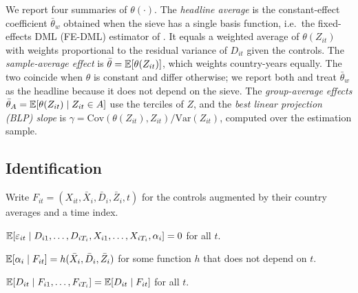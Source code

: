\documentclass[preprint,12pt,authoryear]{elsarticle}
\begin{document}
We report four summaries of $\theta(\cdot)$. The \emph{headline average} is the constant-effect coefficient $\bar\theta_w$ obtained when the sieve has a single basis function, i.e.\ the fixed-effects DML (FE-DML) estimator of \citet{clarke2023panel}. It equals a weighted average of $\theta(Z_{it})$ with weights proportional to the residual variance of $D_{it}$ given the controls. The \emph{sample-average effect} is $\bar\theta=\mathbb{E}[\theta(Z_{it})]$, which weights country-years equally. The two coincide when $\theta$ is constant and differ otherwise; we report both and treat $\bar\theta_w$ as the headline because it does not depend on the sieve. The \emph{group-average effects} $\bar\theta_A=\mathbb{E}[\theta(Z_{it})\mid Z_{it}\in A]$ use the terciles of $Z$, and the \emph{best linear projection (BLP) slope} is $\gamma=\mathrm{Cov}(\theta(Z_{it}),Z_{it})/\mathrm{Var}(Z_{it})$, computed over the estimation sample.

\subsection{Identification}

Write $F_{it}=(X_{it},\bar X_i,\bar D_i,\bar Z_i,t)$ for the controls augmented by their country averages and a time index.

\begin{assumption}\label{as:exo}
$\mathbb{E}[\varepsilon_{it}\mid D_{i1},\dots,D_{iT_i},X_{i1},\dots,X_{iT_i},\alpha_i]=0$ for all $t$.
\end{assumption}

\begin{assumption}\label{as:cre}
$\mathbb{E}[\alpha_i\mid F_{it}]=h(\bar X_i,\bar D_i,\bar Z_i)$ for some function $h$ that does not depend on $t$.
\end{assumption}

\begin{assumption}\label{as:suff}
$\mathbb{E}[D_{it}\mid F_{i1},\dots,F_{iT_i}]=\mathbb{E}[D_{it}\mid F_{it}]$ for all $t$.
\end{assumption}
\end{document}
